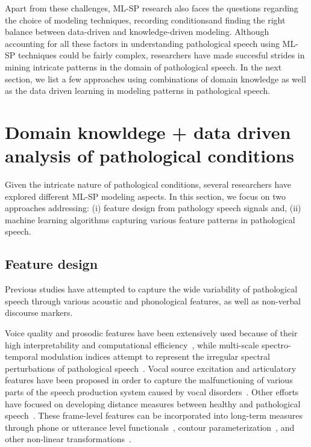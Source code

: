 \documentclass{article}
\begin{document}
Apart from these challenges, ML-SP research also faces the questions regarding the choice of modeling techniques, recording conditionsand finding the right balance between data-driven and knowledge-driven modeling. 
Although accounting for all these factors in understanding pathological speech using ML-SP techniques could be fairly complex, researchers have made succesful strides in mining intricate patterns in the domain of pathological speech.
In the next section, we list a few approaches using combinations of domain knowledge as well as the data driven learning in modeling patterns in pathological speech. 

\section{Domain knowldege + data driven analysis of pathological conditions}
Given the intricate nature of pathological conditions, several researchers have explored different ML-SP modeling aspects. 
In this section, we focus on two approaches addressing: (i) feature design from pathology speech signals and, (ii) machine learning algorithms capturing various feature patterns in pathological speech.
 
\subsection{Feature design}
Previous studies have attempted to capture the wide variability of pathological speech through various acoustic and phonological features, as well as non-verbal discourse markers.

Voice quality and prosodic features have been extensively used because of their high interpretability and computational efficiency~\cite{van2010computational,tsanas2012novel,bone2014psychologist}, while multi-scale spectro-temporal modulation indices attempt to represent the irregular spectral perturbations of pathological speech~\cite{liss2010discriminating,falk2012characterization,williamson2015automatic}. Vocal source excitation and articulatory features have been proposed in order to capture the malfunctioning of various parts of the speech production system caused by vocal disorders~\cite{falk2012characterization,hahm2015parkinson}. Other efforts have focused on developing distance measures between healthy and pathological speech~\cite{gu2005disordered}. These frame-level features can be incorporated into long-term measures through phone or utterance level functionals~\cite{kim2015automatic}, contour parameterization~\cite{kim2015automatic2}, and other non-linear transformations~\cite{kim2015automatic,an2015automatic,middag2011combining}.
\end{document}
